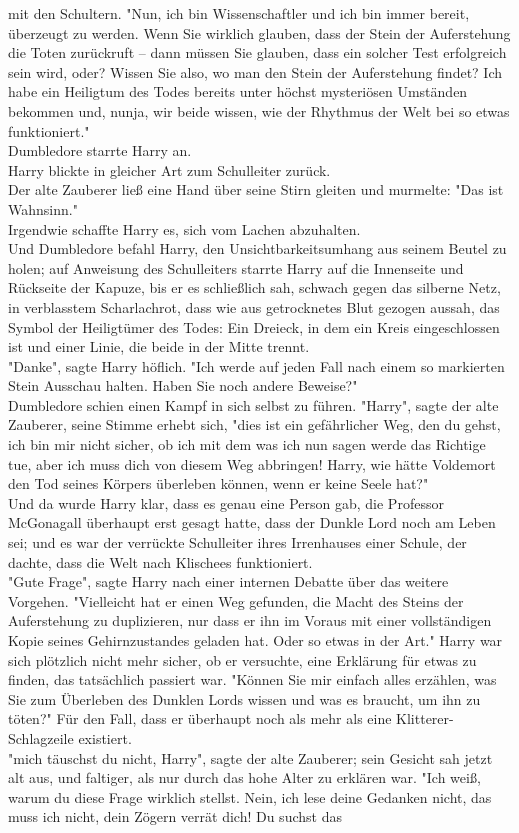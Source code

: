 {mit den Schultern. "Nun, ich bin Wissenschaftler und ich bin immer bereit, überzeugt zu werden. Wenn Sie wirklich glauben, dass der Stein der Auferstehung die Toten zurückruft -- dann müssen Sie glauben, dass ein solcher Test erfolgreich sein wird, oder? Wissen Sie also, wo man den Stein der Auferstehung findet? Ich habe ein Heiligtum des Todes bereits unter höchst mysteriösen Umständen bekommen und, nunja, wir beide wissen, wie der Rhythmus der Welt bei so etwas funktioniert."\\ Dumbledore starrte Harry an.\\ Harry blickte in gleicher Art zum Schulleiter zurück.\\ Der alte Zauberer ließ eine Hand über seine Stirn gleiten und murmelte: "Das ist Wahnsinn."\\ Irgendwie schaffte Harry es, sich vom Lachen abzuhalten.\\ Und Dumbledore befahl Harry, den Unsichtbarkeitsumhang aus seinem Beutel zu holen; auf Anweisung des Schulleiters starrte Harry auf die Innenseite und Rückseite der Kapuze, bis er es schließlich sah, schwach gegen das silberne Netz, in verblasstem Scharlachrot, dass wie aus getrocknetes Blut gezogen aussah, das Symbol der Heiligtümer des Todes: Ein Dreieck, in dem ein Kreis eingeschlossen ist und einer Linie, die beide in der Mitte trennt.\\ "Danke", sagte Harry höflich. "Ich werde auf jeden Fall nach einem so markierten Stein Ausschau halten. Haben Sie noch andere Beweise?"\\ Dumbledore schien einen Kampf in sich selbst zu führen. "Harry", sagte der alte Zauberer, seine Stimme erhebt sich, "dies ist ein gefährlicher Weg, den du gehst, ich bin mir nicht sicher, ob ich mit dem was ich nun sagen werde das Richtige tue, aber ich muss dich von diesem Weg abbringen! Harry, wie hätte Voldemort den Tod seines Körpers überleben können, wenn er keine Seele hat?"\\ Und da wurde Harry klar, dass es genau eine Person gab, die Professor McGonagall überhaupt erst gesagt hatte, dass der Dunkle Lord noch am Leben sei; und es war der verrückte Schulleiter ihres Irrenhauses einer Schule, der dachte, dass die Welt nach Klischees funktioniert.\\ "Gute Frage", sagte Harry nach einer internen Debatte über das weitere Vorgehen. "Vielleicht hat er einen Weg gefunden, die Macht des Steins der Auferstehung zu duplizieren, nur dass er ihn im Voraus mit einer vollständigen Kopie seines Gehirnzustandes geladen hat. Oder so etwas in der Art." Harry war sich plötzlich nicht mehr sicher, ob er versuchte, eine Erklärung für etwas zu finden, das tatsächlich passiert war. "Können Sie mir einfach alles erzählen, was Sie zum Überleben des Dunklen Lords wissen und was es braucht, um ihn zu töten?" Für den Fall, dass er überhaupt noch als mehr als eine Klitterer-Schlagzeile existiert.\\ "mich täuschst du nicht, Harry", sagte der alte Zauberer; sein Gesicht sah jetzt alt aus, und faltiger, als nur durch das hohe Alter zu erklären war. "Ich weiß, warum du diese Frage wirklich stellst. Nein, ich lese deine Gedanken nicht, das muss ich nicht, dein Zögern verrät dich! Du suchst das }
